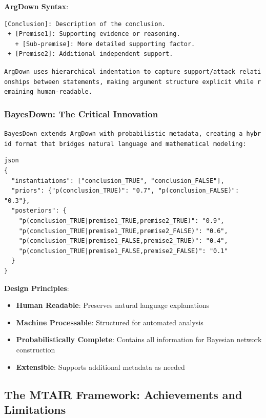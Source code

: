 \documentclass[
  11pt,
  letterpaper,
]{book}
\providecommand{\tightlist}{%
  \setlength{\itemsep}{0pt}\setlength{\parskip}{0pt}}
\begin{document}
\textbf{ArgDown Syntax}:

\begin{verbatim}
[Conclusion]: Description of the conclusion.
 + [Premise1]: Supporting evidence or reasoning.
   + [Sub-premise]: More detailed supporting factor.
 + [Premise2]: Additional independent support.
\end{verbatim}

\texttt{ArgDown\ uses\ hierarchical\ indentation\ to\ capture\ support/attack\ relationships\ between\ statements,\ making\ argument\ structure\ explicit\ while\ remaining\ human-readable.}

\subsubsection{BayesDown: The Critical
Innovation}\label{sec-bayesdown-innovation}

\texttt{BayesDown\ extends\ ArgDown\ with\ probabilistic\ metadata,\ creating\ a\ hybrid\ format\ that\ bridges\ natural\ language\ and\ mathematical\ modeling:}

\begin{verbatim}
json
{
  "instantiations": ["conclusion_TRUE", "conclusion_FALSE"],
  "priors": {"p(conclusion_TRUE)": "0.7", "p(conclusion_FALSE)": "0.3"},
  "posteriors": {
    "p(conclusion_TRUE|premise1_TRUE,premise2_TRUE)": "0.9",
    "p(conclusion_TRUE|premise1_TRUE,premise2_FALSE)": "0.6",
    "p(conclusion_TRUE|premise1_FALSE,premise2_TRUE)": "0.4",
    "p(conclusion_TRUE|premise1_FALSE,premise2_FALSE)": "0.1"
  }
}
\end{verbatim}

\textbf{Design Principles}:

\begin{itemize}
\tightlist
\item
  \textbf{Human Readable}: Preserves natural language explanations
\item
  \textbf{Machine Processable}: Structured for automated analysis
\item
  \textbf{Probabilistically Complete}: Contains all information for
  Bayesian network construction
\item
  \textbf{Extensible}: Supports additional metadata as needed
\end{itemize}

\subsection{The MTAIR Framework: Achievements and
Limitations}\label{sec-mtair-framework}
\end{document}
